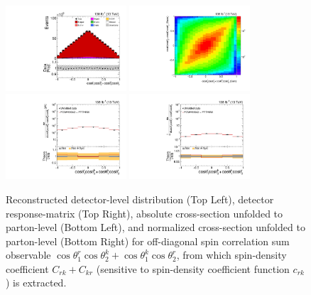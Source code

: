 \clearpage
\begin{figure}[htb]
\begin{center}
 \includegraphics[width=0.40\textwidth]{fig_fullRun2UL/controlplots/combined/Hyp_LLBarCPrk.pdf}
 \includegraphics[width=0.40\textwidth]{fig_fullRun2UL/unfolding/combined/ResponseMatrix_c_Prk.pdf} \\
 \includegraphics[width=0.40\textwidth]{fig_fullRun2UL/unfolding/combined/UnfoldedResults_c_Prk.pdf}
 \includegraphics[width=0.40\textwidth]{fig_fullRun2UL/unfolding/combined/UnfoldedResultsNorm_c_Prk.pdf} \\
\label{fig:c_Prk}
\caption{Reconstructed detector-level distribution (Top Left), detector response-matrix (Top Right), absolute cross-section unfolded to parton-level (Bottom Left), and normalized cross-section unfolded to parton-level (Bottom Right) for off-diagonal spin correlation sum observable $\cos\theta_{1}^{r}\cos\theta_{2}^{k}+\cos\theta_{1}^{k}\cos\theta_{2}^{r}$, from which spin-density coefficient $C_{rk}+C_{kr}$ (sensitive to spin-density coefficient function $c_{r k}$) is extracted.}
\end{center}
\end{figure}
